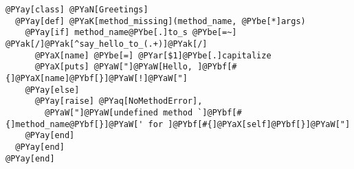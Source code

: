 \begin{Verbatim}[commandchars=@\[\]]
@PYay[class] @PYaN[Greetings]
  @PYay[def] @PYaK[method_missing](method_name, @PYbe[*]args)
    @PYay[if] method_name@PYbe[.]to_s @PYbe[=~] @PYak[/]@PYak[^say_hello_to_(.+)]@PYak[/]
      @PYaX[name] @PYbe[=] @PYar[$1]@PYbe[.]capitalize
      @PYaX[puts] @PYaW["]@PYaW[Hello, ]@PYbf[#{]@PYaX[name]@PYbf[}]@PYaW[!]@PYaW["]
    @PYay[else]
      @PYay[raise] @PYaq[NoMethodError],
        @PYaW["]@PYaW[undefined method `]@PYbf[#{]method_name@PYbf[}]@PYaW[' for ]@PYbf[#{]@PYaX[self]@PYbf[}]@PYaW["]
    @PYay[end]
  @PYay[end]
@PYay[end]
\end{Verbatim}
